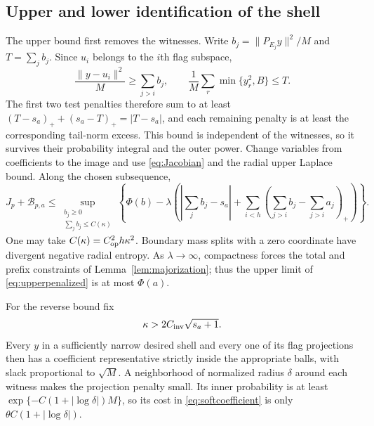 \documentclass[11pt]{article}
\numberwithin{equation}{section}
\theoremstyle{definition}
\newcommand{\norm}[1]{\lVert #1\rVert}
\begin{document}
\subsection{Upper and lower identification of the shell}
The upper bound first removes the witnesses. Write $b_j=\norm{P_{E_j}y}^2/M$ and $T=\sum_jb_j$. Since $u_i$ belongs to the $i$th flag subspace,
\[
\frac{\norm{y-u_i}^2}{M}\ge\sum_{j>i}b_j,
\qquad
\frac1M\sum_r\min\{y_r^2,B\}\le T.
\]
The first two test penalties therefore sum to at least
$(T-s_a)_++(s_a-T)_+=|T-s_a|$, and each remaining penalty is at least the corresponding tail-norm excess. This bound is independent of the witnesses, so it survives their probability integral and the outer power. Change variables from coefficients to the image and use \eqref{eq:Jacobian} and the radial upper Laplace bound. Along the chosen subsequence,
\begin{equation}\label{eq:upperpenalized}
J_p+\mathcal B_{p,a}\le
\sup_{\substack{b_j\ge0\\\sum_jb_j\le C(\kappa)}}
\left\{\Phi(b)-\lambda\left(
\left|\sum_jb_j-s_a\right|+
\sum_{i<h}\left(\sum_{j>i}b_j-\sum_{j>i}a_j\right)_+
\right)\right\}.
\end{equation}
One may take $C(\kappa)=C_{\rm op}^2h\kappa^2$. Boundary mass splits with a zero coordinate have divergent negative radial entropy. As $\lambda\to\infty$, compactness forces the total and prefix constraints of Lemma~\ref{lem:majorization}; thus the upper limit of \eqref{eq:upperpenalized} is at most $\Phi(a)$.

For the reverse bound fix
\begin{equation}\label{eq:kappachoice}
\kappa>2C_{\rm inv}\sqrt{s_a+1}.
\end{equation}
Every $y$ in a sufficiently narrow desired shell and every one of its flag projections then has a coefficient representative strictly inside the appropriate balls, with slack proportional to $\sqrt M$. A neighborhood of normalized radius $\delta$ around each witness makes the projection penalty small. Its inner probability is at least $\exp\{-C(1+|\log\delta|)M\}$, so its cost in \eqref{eq:softcoefficient} is only $\theta C(1+|\log\delta|)$.
\end{document}
